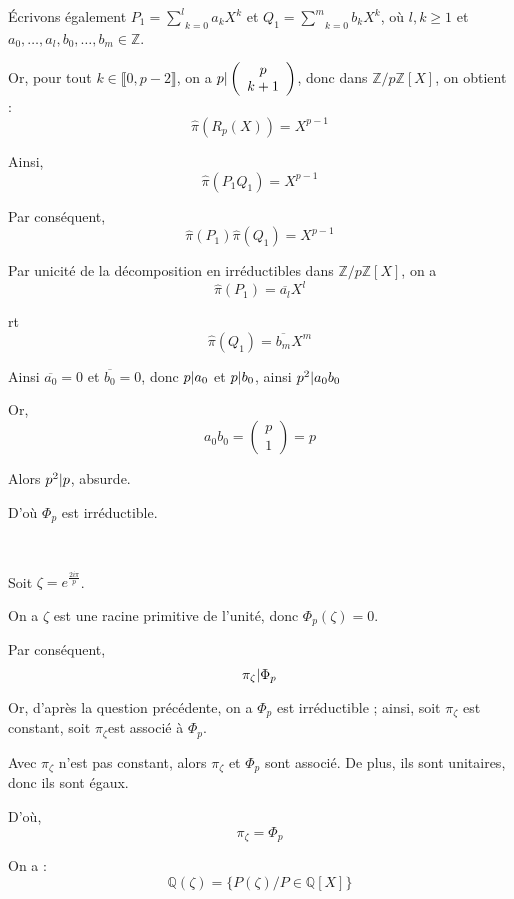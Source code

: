 {\'E}crivons {\'e}galement $P_1 = \underset{k = 0}{\overset{l}{\sum}} a_k X^k$
et $Q_1 = \underset{k = 0}{\overset{m}{\sum}} b_k X^k$, o{\`u} $l, k \geqslant
1$ et $a_0, \ldots, a_l, b_0, \ldots, b_m \in \mathbb{Z}$.

Or, pour tout $k \in \llbracket 0, p - 2 \rrbracket$, on a $p | 
\left( \begin{array}{c}
  p\\
  k + 1
\end{array} \right)$, donc dans $\mathbb{Z}/ p\mathbb{Z} [X]$, on obtient :
\[ \hat{\pi} (R_p (X)) = X^{p - 1} \]


Ainsi,
\[ \hat{\pi} (P_1 Q_1) = X^{p - 1} \]


Par cons{\'e}quent,
\[ \hat{\pi} (P_1) \hat{\pi} (Q_1) = X^{p - 1} \]


Par unicit{\'e} de la d{\'e}composition en irr{\'e}ductibles dans $\mathbb{Z}/
p\mathbb{Z} [X]$, on a
\[ \hat{\pi} (P_1) = \overline{a_l} X^l \]


rt
\[ \hat{\pi} (Q_1) = \overline{b_m} X^m \]


Ainsi $\overline{a_0} = 0$ et $\overline{b_0} = 0$, donc $p | a_0 $
et $p | b_0 $, ainsi $p^2 | a_0 b_0 $

Or,
\[ a_0 b_0 = \left( \begin{array}{c}
     p\\
     1
   \end{array} \right) = p \]


Alors $p^2 | p $, absurde.

D'o{\`u} $\Phi_p$ est irr{\'e}ductible.

\

 Soit $\zeta = e^{\frac{2 i \pi}{p}}$.

On a $\zeta$ est une racine primitive de l'unit{\'e}, donc $\Phi_p (\zeta) =
0$.

Par cons{\'e}quent,
\[ \pi_{\zeta} | \Phi_p  \]


Or, d'apr{\`e}s la question pr{\'e}c{\'e}dente, on a $\Phi_p$ est
irr{\'e}ductible ; ainsi, soit $\pi_{\zeta}$ est constant, soit $\pi_{\zeta}
$est associ{\'e} {\`a} $\Phi_p$.

Avec $\pi_{\zeta}$ n'est pas constant, alors $\pi_{\zeta}$ et $\Phi_p$ sont
associ{\'e}. De plus, ils sont unitaires, donc ils sont {\'e}gaux.

D'o{\`u},
\[ \pi_{\zeta} = \Phi_p \]


On a :
\[ \mathbb{Q} (\zeta) = \{ P (\zeta) / P \in \mathbb{Q} [X] \} \]


